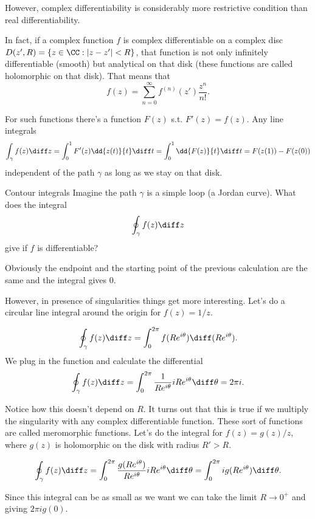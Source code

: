\begin{frame}
	However, complex differentiability is considerably more restrictive condition than real differentiability. 
	
	\pause
	In fact, if a complex function $ f $ is complex differentiable on a complex disc $ D(z',R) = \{ z \in \CC : |z-z'| < R \}$, that function is not only infinitely differentiable (smooth) but analytical on that disk (these functions are called \alert{holomorphic} on that disk). That means that 
	\[ f(z) = \sum_{n=0}^{\infty} f^{(n)}(z') \frac{z^n}{n!}. \]
	
	\pause
	For such functions there's a function $ F(z) $ s.t. $ F'(z) = f(z) $. Any line integrals
	\[ \int_\gamma f(z) \diff z = \int_{0}^{1} F'(z) \dd{z(t)}{t} \diff t 
	= \int_{0}^{1} \dd{F(z)}{t}  \diff t = F(z(1))-F(z(0)) \]
	independent of the path $ \gamma $ as long as we stay on that disk.
\end{frame}

\begin{frame}{Contour integrals}
	Imagine the path $ \gamma $ is a simple loop (a Jordan curve). What does the integral 
	\[ \oint_\gamma f(z) \diff z \]
	give if $ f $ is differentiable?
	
	\pause
	Obviously the endpoint and the starting point of the previous calculation are the same and the integral gives 0. 
	
	\pause
	However, in presence of singularities things get more interesting. Let's do a circular line integral around the origin for $ f(z) = 1/z $.
\end{frame}

\begin{frame}
	\[ \oint_\gamma f(z) \diff z = \int_{0}^{2\pi} f(R e^{i\theta}) \diff (R e^{i\theta}). \]
	We plug in the function and calculate the differential
	\[ \oint_\gamma f(z) \diff z = \int_{0}^{2\pi} \frac{1}{R e^{i\theta}} iR e^{i\theta} \diff \theta = 2\pi i. \]
	
	\pause
	Notice how this doesn't depend on $ R $. It turns out that this is true if we multiply the singularity with any complex differentiable function. These sort of functions are called \alert{meromorphic} functions. Let's do the integral for $ f(z) = g(z)/z $, where $ g(z) $ is holomorphic on the disk with radius $ R' > R $. 
	
	\pause
	\[ \oint_\gamma f(z) \diff z = \int_{0}^{2\pi} \frac{g(R e^{i\theta})}{R e^{i\theta}} iR e^{i\theta} \diff \theta 
	= \int_{0}^{2\pi} i g(R e^{i\theta}) \diff \theta.
	\]
	
	\pause
	Since this integral can be as small as we want we can take the limit $ R \to 0^{+} $ and giving $ 2\pi i g(0)$.
\end{frame}

